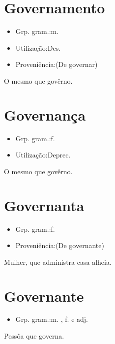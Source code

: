 \section{Governamento}
\begin{itemize}
\item {Grp. gram.:m.}
\end{itemize}
\begin{itemize}
\item {Utilização:Des.}
\end{itemize}
\begin{itemize}
\item {Proveniência:(De \textunderscore governar\textunderscore )}
\end{itemize}
O mesmo que \textunderscore govêrno\textunderscore .
\section{Governança}
\begin{itemize}
\item {Grp. gram.:f.}
\end{itemize}
\begin{itemize}
\item {Utilização:Deprec.}
\end{itemize}
O mesmo que \textunderscore govêrno\textunderscore .
\section{Governanta}
\begin{itemize}
\item {Grp. gram.:f.}
\end{itemize}
\begin{itemize}
\item {Proveniência:(De \textunderscore governante\textunderscore )}
\end{itemize}
Mulher, que administra casa alheia.
\section{Governante}
\begin{itemize}
\item {Grp. gram.:m. ,  f.  e  adj.}
\end{itemize}
Pessôa que governa.
